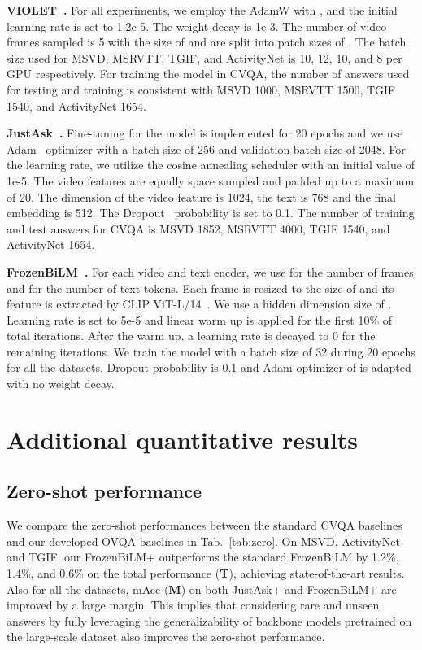 \documentclass[10pt,twocolumn,letterpaper]{article}
\begin{document}
\noindent \textbf{VIOLET~\cite{fu2021violet}.}
 For all experiments, we employ the AdamW with , and the initial learning rate is set to 1.2e-5. 
 The weight decay is 1e-3. 
 The number of video frames sampled is 5 with the size of  and are split into patch sizes of . 
 The batch size used for MSVD, MSRVTT, TGIF, and ActivityNet is 10, 12, 10, and 8 per GPU respectively. 
 For training the model in CVQA, the number of answers used for testing and training is consistent with MSVD 1000, MSRVTT 1500, TGIF 1540, and ActivityNet 1654.
 
\noindent \textbf{JustAsk~\cite{yang2021just}.}
Fine-tuning for the model is implemented for 20 epochs and we use Adam~\cite{kingma2014adam} optimizer with a batch size of 256 and validation batch size of 2048. 
For the learning rate, we utilize the cosine annealing scheduler with an initial value of 1e-5. 
The video features are equally space sampled and padded up to a maximum of 20. 
The dimension of the video feature is 1024, the text is 768 and the final embedding is 512. 
The Dropout~\cite{srivastava2014dropout} probability is set to 0.1. 
The number of training and test answers for CVQA is MSVD 1852, MSRVTT 4000, TGIF 1540, and ActivityNet 1654. 

\noindent \textbf{FrozenBiLM~\cite{yang2022zero}.}
For each video and text encder, we use  for the number of frames and  for the number of text tokens.
Each frame is resized to the size of  and its feature is extracted by CLIP ViT-L/14~\cite{radford2021learning,dosovitskiy2020image}.
We use a hidden dimension size of .
Learning rate is set to 5e-5 and linear warm up is applied for the first 10\% of total iterations.
After the warm up, a learning rate is decayed to 0 for the remaining iterations.
We train the model with a batch size of 32 during 20 epochs for all the datasets.
Dropout probability is 0.1 and Adam optimizer of  is adapted with no weight decay. \section{Additional quantitative results}

\subsection{Zero-shot performance}
We compare the zero-shot performances between the standard CVQA baselines and our developed OVQA baselines in Tab.~\ref{tab:zero}.
On MSVD, ActivityNet and TGIF, our FrozenBiLM+ outperforms the standard FrozenBiLM by 1.2\%, 1.4\%, and 0.6\% on the total performance (\textbf{T}), achieving state-of-the-art results.
Also for all the datasets, mAcc (\textbf{M}) on both JustAsk+ and FrozenBiLM+ are improved by a large margin.
This implies that considering rare and unseen answers by fully leveraging the generalizability of backbone models pretrained on the large-scale dataset also improves the zero-shot performance.
\end{document}
